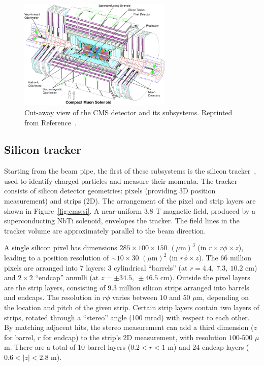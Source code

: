 \begin{figure}[][]
    \begin{center}
        \includegraphics[width=0.65\textwidth]{figures/cms/cms.png}
        \caption{Cut-away view of the CMS detector and its subsystems.
                 Reprinted from Reference~\cite{cmsjinst}.}
        \label{fig:cms:cms}
    \end{center}
\end{figure}

\subsection{Silicon tracker}
\label{sec:cms:tracker}

Starting from the beam pipe, the first of these subsystems is the silicon tracker~\cite{cmstracker}, used to identify charged particles and measure their momenta. 
The tracker consists of silicon detector geometries: pixels (providing 3D position measurement) and strips (2D). 
The arrangement of the pixel and strip layers are shown in Figure~\ref{fig:cms:si}.
A near-uniform 3.8 T magnetic field, produced by a superconducting NbTi solenoid, envelopes the tracker. 
The field lines in the tracker volume are approximately parallel to the beam direction. 

A single silicon pixel has dimensions $285\times100\times150$ $(\mu\mathrm{m})^3$ (in $r\times r\phi\times z$), leading to a position resolution of $\sim10\times30$ $(\mu\mathrm{m})^2$ (in $r\phi\times z$). 
The 66 million pixels are arranged into 7 layers: 3 cylindrical ``barrels'' (at $r=4.4,~7.3,~10.2$ cm) and $2\times2$ ``endcap'' annulli (at $z=\pm34.5,~\pm46.5$ cm). 
Outside the pixel layers are the strip layers, consisting of 9.3 million silicon strips arranged into barrels and endcaps.
The resolution in $r\phi$ varies between $10$ and $50$ $\mu$m, depending on the location and pitch of the given strip.
Certain strip layers contain two layers of strips, rotated through a ``stereo'' angle (100 mrad) with respect to each other.
By matching adjacent hits, the stereo measurement can add a third dimension ($z$ for barrel, $r$ for endcap) to the strip's 2D measurement, with resolution $100$-$500$ $\mu$m.
There are a total of 10 barrel layers ($0.2 < r < 1$ m) and 24 endcap layers ($0.6 < |z| < 2.8$ m). 

